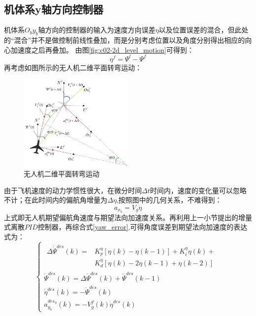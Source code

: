 \subsection{机体系y轴方向控制器}
机体系$O_by_b$轴方向的控制器的输入为速度方向误差$\eta$以及位置误差的混合，但此处的“混合”并不是做控制前线性叠加，而是分别考虑位置以及角度分别得出相应的向心加速度之后再叠加。
由图\ref{fig:c02-2d_level_motion}可得到：
\begin{equation}
    \eta^f=\Psi^l-\Psi^f
    \label{yaw_error}
\end{equation}
再考虑如图所示的无人机二维平面转弯运动：
\begin{figure}[H]
    \centering
    \includegraphics[width=0.5\textwidth]{figures/c3/c3-BTT.png}
    \caption{无人机二维平面转弯运动}\label{fig:c3-BTT}
\end{figure}
由于飞机速度的动力学惯性很大，在微分时间$\Delta t$时间内，速度的变化量可以忽略不计；在此时间内的偏航角增量为$\Delta\eta$,按照图中的几何关系，不难得到：
\begin{equation}
    a_{x_b}=V_g\dot{\eta}
    \label{btt_dot}
\end{equation}
上式即无人机期望偏航角速度与期望法向加速度关系。再利用上一小节提出的增量式离散$PID$控制器，再综合式\ref{yaw_error},可得角度误差到期望法向加速度的表达式为：
\begin{equation}
    \left\{
        \begin{array}{l}
    \begin{aligned}
        \Delta\dot{\Psi}^{des}(k)=&K_{p}^{\eta}[\eta(k)-\eta(k-1)]+K_{i}^{\eta}\eta(k)+\\
        &K_{d}^{\eta}[\eta(k)-2\eta(k-1)+\eta(k-2)]
        \end{aligned}\\
        \dot{\Psi}^{des}(k)=\Delta\dot{\Psi}^{des}(k)+\dot{\Psi}^{des}(k-1)\\
        \dot{\eta}^{des}(k)=-\dot{\Psi}^{des}(k)\\
        a_{y_b}^{des_{\eta}}(k)=-V_g^{f}(k)\dot{\eta}^{des}(k)
\end{array}
\right .
    \label{angle_controller}
\end{equation}
